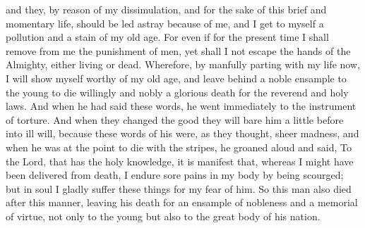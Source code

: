 {and
{} they, by reason of my dissimulation, and for the sake of this brief and momentary life, should be led astray because of me,
 and
{} I get to myself a pollution and a stain of my old age.
For even if for the present time I shall remove from me the punishment of men, yet shall I not escape the hands of the Almighty, either living or dead.
Wherefore, by manfully parting with my life now, I will show myself worthy of my old age,
and
 leave behind a noble ensample to the young to die willingly and nobly a glorious death for the reverend and holy laws. And when he had said these words, he went immediately to the instrument of torture.
 And when they changed the good they will bare him a little before into ill will, because
 these words of his were, as they thought, sheer madness,
and when he was at the point to die with the
 stripes, he groaned aloud and said, To the Lord, that has the holy knowledge, it is manifest that, whereas I might have been delivered from death, I endure sore pains in my body by being scourged; but in soul I gladly suffer these things for my fear of him.
So this man also died after this manner, leaving his death for an ensample of nobleness and a memorial of virtue, not only to the young but also to the great body of his nation.

}
